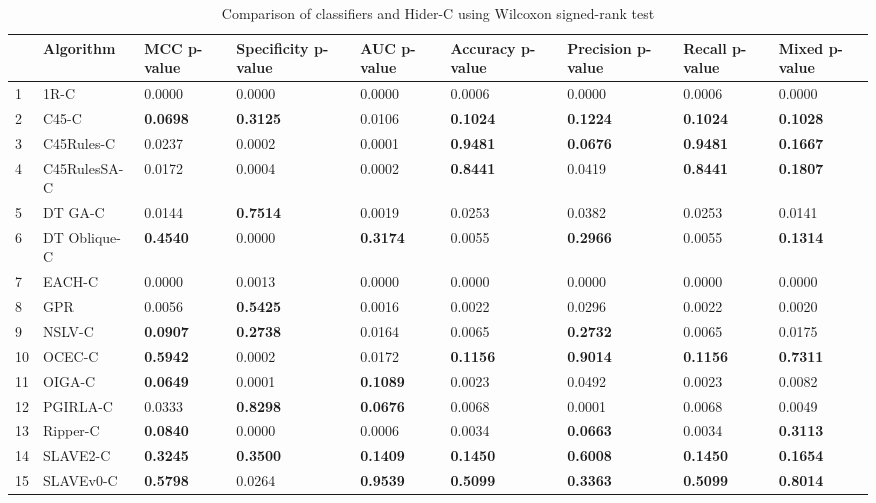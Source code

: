 \begin{table}
\footnotesize
\caption{Comparison of classifiers and Hider-C using Wilcoxon signed-rank test}
\label{tab:wilcoxon comparison}
\begin{tabular}{lllllllll}
\hline
 & Algorithm & MCC p-value & Specificity p-value & AUC p-value & Accuracy p-value & Precision p-value & Recall p-value & Mixed p-value \\
\hline
1 & 1R-C & 0.0000 & 0.0000 & 0.0000 & 0.0006 & 0.0000 & 0.0006 & 0.0000 \\
2 & C45-C & \textbf{0.0698} & \textbf{0.3125} & 0.0106 & \textbf{0.1024} & \textbf{0.1224} & \textbf{0.1024} & \textbf{0.1028} \\
3 & C45Rules-C & 0.0237 & 0.0002 & 0.0001 & \textbf{0.9481} & \textbf{0.0676} & \textbf{0.9481} & \textbf{0.1667} \\
4 & C45RulesSA-C & 0.0172 & 0.0004 & 0.0002 & \textbf{0.8441} & 0.0419 & \textbf{0.8441} & \textbf{0.1807} \\
5 & DT GA-C & 0.0144 & \textbf{0.7514} & 0.0019 & 0.0253 & 0.0382 & 0.0253 & 0.0141 \\
6 & DT Oblique-C & \textbf{0.4540} & 0.0000 & \textbf{0.3174} & 0.0055 & \textbf{0.2966} & 0.0055 & \textbf{0.1314} \\
7 & EACH-C & 0.0000 & 0.0013 & 0.0000 & 0.0000 & 0.0000 & 0.0000 & 0.0000 \\
8 & GPR & 0.0056 & \textbf{0.5425} & 0.0016 & 0.0022 & 0.0296 & 0.0022 & 0.0020 \\
9 & NSLV-C & \textbf{0.0907} & \textbf{0.2738} & 0.0164 & 0.0065 & \textbf{0.2732} & 0.0065 & 0.0175 \\
10 & OCEC-C & \textbf{0.5942} & 0.0002 & 0.0172 & \textbf{0.1156} & \textbf{0.9014} & \textbf{0.1156} & \textbf{0.7311} \\
11 & OIGA-C & \textbf{0.0649} & 0.0001 & \textbf{0.1089} & 0.0023 & 0.0492 & 0.0023 & 0.0082 \\
12 & PGIRLA-C & 0.0333 & \textbf{0.8298} & \textbf{0.0676} & 0.0068 & 0.0001 & 0.0068 & 0.0049 \\
13 & Ripper-C & \textbf{0.0840} & 0.0000 & 0.0006 & 0.0034 & \textbf{0.0663} & 0.0034 & \textbf{0.3113} \\
14 & SLAVE2-C & \textbf{0.3245} & \textbf{0.3500} & \textbf{0.1409} & \textbf{0.1450} & \textbf{0.6008} & \textbf{0.1450} & \textbf{0.1654} \\
15 & SLAVEv0-C & \textbf{0.5798} & 0.0264 & \textbf{0.9539} & \textbf{0.5099} & \textbf{0.3363} & \textbf{0.5099} & \textbf{0.8014} \\
\hline
\end{tabular}
\end{table}
